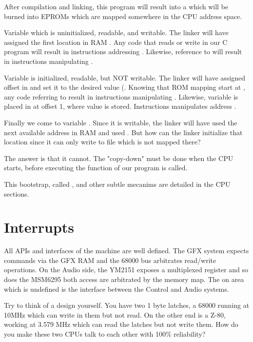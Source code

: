 After compilation and linking, this program will result into a  which will be burned into EPROMs which are mapped somewhere in the CPU address space.



Variable  which is uninitialized, readable, and writable. The linker will have assigned the first location in RAM . Any code that reads or write  in our C program will result in instructions addressing . Likewise, reference to  will result in instructions manipulating .

Variable   is initialized, readable, but NOT writable. The linker will have assigned offset  in  and set it to the desired value (. Knowing that ROM mapping start at , any code referring to  result in instructions manipulating . Likewise, variable  is placed in  at offset 1, where value  is stored. Instructions manipulates address .

Finally we come to variable . Since it is writable, the linker will have used the next available address in RAM and used . But how can the linker initialize that location since it can only write to file  which is not mapped there? 

The answer is that it cannot. The "copy-down" must be done when the CPU starts, before executing the  function of our program is called. 

This bootstrap, called , and other subtle mecanims are detailed in the CPU sections.


\section{Interrupts}

All APIs and interfaces of the machine are well defined. The GFX system expects commands via the GFX RAM and the 68000 bus arbitrates read/write operations. On the Audio side, the YM2151 exposes a multiplexed register and so does the MSM6295 both access are arbitrated by the memory map. The on area which is undefined is the interface between the Control and Audio systems.

Try to think of a design yourself. You have two 1 byte latches, a 68000 running at 10MHz which can write in them but not read. On the other end is a Z-80, working at 3.579 MHz which can read the latches but not write them. How do you make these two CPUs talk to each other with 100\% reliability?

